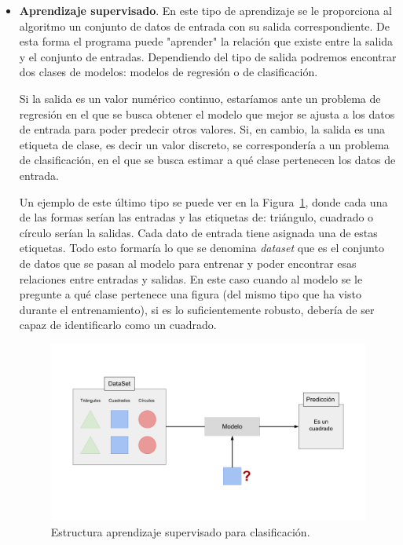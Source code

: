 \documentclass[a4paper, 12pt]{book}
\begin{document}
\begin{itemize}
    \item \textbf{Aprendizaje supervisado}. En este tipo de aprendizaje se le proporciona al algoritmo un conjunto de datos de entrada con su salida correspondiente. De esta forma el programa puede "aprender" la relación que existe entre la salida y el conjunto de entradas. Dependiendo del tipo de salida podremos encontrar dos clases de modelos: modelos de regresión o de clasificación.
    
    Si la salida es un valor numérico continuo, estaríamos ante un problema de regresión en el que se busca obtener el modelo que mejor se ajusta a los datos de entrada para poder predecir otros valores. Si, en cambio, la salida es una etiqueta de clase, es decir un valor discreto, se correspondería a un problema de clasificación, en el que se busca estimar a qué clase pertenecen los datos de entrada. 
    
    Un ejemplo de este último tipo se puede ver en la Figura~\ref{fig:a_supervisado}, donde cada una de las formas serían las entradas y las etiquetas de: triángulo, cuadrado o círculo serían la salidas. Cada dato de entrada tiene asignada una de estas etiquetas. Todo esto formaría lo que se denomina \textit{dataset} que es el conjunto de datos que se pasan al modelo para entrenar y poder encontrar esas relaciones entre entradas y salidas. En este caso cuando al modelo se le pregunte a qué clase pertenece una figura (del mismo tipo que ha visto durante el entrenamiento), si es lo suficientemente robusto, debería de ser capaz de identificarlo como un cuadrado.
    
    \begin{figure}[htb]
      \centering
      \includegraphics[width=12cm, keepaspectratio]{img/a_supervisado.png}
      \caption{Estructura aprendizaje supervisado para clasificación.}\label{fig:a_supervisado}
    \end{figure}
    

\end{itemize}
\end{document}
